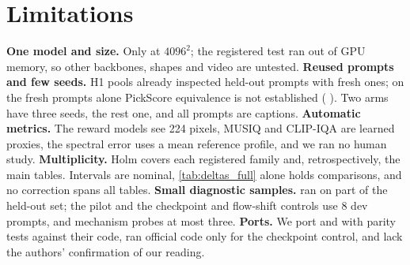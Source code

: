 \section{Limitations}\label{sec:limitations}
\textbf{One model and size.} Only \krea{} at $4096^2$; the registered \qwen{} test ran out of GPU memory, so other backbones, shapes and video are untested. \textbf{Reused prompts and few seeds.} H1 pools  already inspected held-out prompts with  fresh ones; on the fresh prompts alone PickScore equivalence is not established ( ). Two arms have three seeds, the rest one, and all prompts are \afk{} captions. \textbf{Automatic metrics.} The reward models see 224 pixels, MUSIQ and CLIP-IQA are learned proxies, the spectral error uses a mean reference profile, and we ran no human study. \textbf{Multiplicity.} Holm covers each registered family and, retrospectively, the main tables. Intervals are nominal, \cref{tab:deltas_full} alone holds  comparisons, and no correction spans all tables. \textbf{Small diagnostic samples.} \constancy{} ran on part of the held-out set; the pilot and the checkpoint and flow-shift controls use 8 dev prompts, and mechanism probes at most three. \textbf{Ports.} We port \sega{} and \dype{} with parity tests against their code, ran official \dype{} code only for the checkpoint control, and lack the \sega{} authors' confirmation of our reading.
